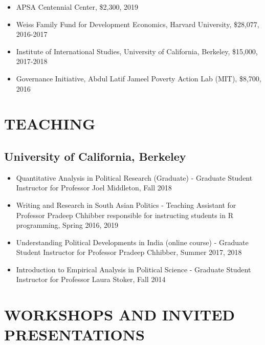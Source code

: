 \documentclass[10pt]{article}
\begin{document}
\begin{itemize}[nosep]
\item[] APSA Centennial Center, \$2,300, 2019

\item[] Weiss Family Fund for Development Economics, Harvard University, \$28,077, 2016-2017
	 
\item[]Institute of International Studies, University of California, Berkeley, \$15,000, 2017-2018
\item[] Governance Initiative, Abdul Latif Jameel Poverty Action Lab (MIT), \$8,700, 2016	
\end{itemize}


\vspace{3mm}
\section*{TEACHING}


\subsection*{University of California, Berkeley}

\begin{itemize}
	\item[]Quantitative Analysis in Political Research (Graduate) - Graduate Student Instructor for Professor Joel Middleton, Fall 2018 
		\item[]Writing and Research in South Asian Politics - Teaching Assistant for Professor Pradeep Chhibber responsible for instructing students in \textsf{R} programming, Spring 2016, 2019
	\item[]Understanding Political Developments in India (online course) - Graduate Student Instructor for Professor Pradeep Chhibber, Summer 2017, 2018
	\item[]Introduction to Empirical Analysis in Political Science - Graduate Student Instructor for Professor Laura Stoker, Fall 2014	
\end{itemize}

\vspace{3mm}
\section*{WORKSHOPS AND INVITED PRESENTATIONS}
\end{document}
